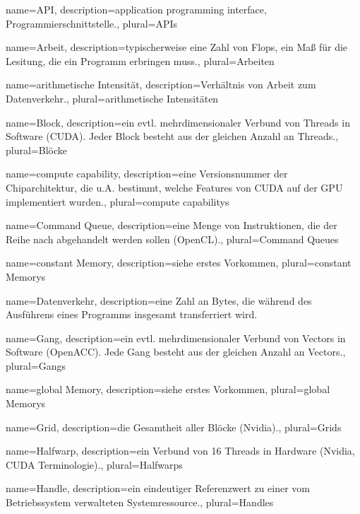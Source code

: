{
	name=API,
	description={application programming interface, Programmierschnittstelle.},
	plural=APIs
}

{
	name=Arbeit,
	description={typischerweise eine Zahl von Flops, ein Maß für die Lesitung, die ein Programm erbringen muss.},
	plural=Arbeiten
}

{
	name=arithmetische Intensität,
	description={Verhältnis von Arbeit zum Datenverkehr.},
	plural=arithmetische Intensitäten
}

{
	name=Block,
	description={ein evtl. mehrdimensionaler Verbund von Threads in Software (CUDA). Jeder Block besteht aus der gleichen Anzahl an Threads.},
	plural=Blöcke
}

{
	name=compute capability,
	description={eine Versionsnummer der Chiparchitektur, die u.A. bestimmt, welche Features von CUDA auf der GPU implementiert wurden.},
	plural=compute capabilitys
}

{
	name=Command Queue,
	description={eine Menge von Instruktionen, die der Reihe nach abgehandelt werden sollen (OpenCL).},
	plural=Command Queues
}

{
	name=constant Memory,
	description={siehe erstes Vorkommen},
	plural=constant Memorys
}

{
	name=Datenverkehr,
	description={eine Zahl an Bytes, die während des Ausführens eines Programms insgesamt transferriert wird.}
}

{
	name=Gang,
	description={ein evtl. mehrdimensionaler Verbund von Vectors in Software (OpenACC). Jede Gang besteht aus der gleichen Anzahl an Vectors.},
	plural=Gangs
}

{
	name=global Memory,
	description={siehe erstes Vorkommen},
	plural=global Memorys
}

{
	name=Grid,
	description={die Gesamtheit aller Blöcke (Nvidia).},
	plural=Grids
}

{
	name=Halfwarp,
	description={ein Verbund von 16 Threads in Hardware (Nvidia, CUDA Terminologie).},
	plural=Halfwarps
}

{
	name=Handle,
	description={ein eindeutiger Referenzwert zu einer vom Betriebssystem verwalteten Systemressource.},
	plural=Handles
}

